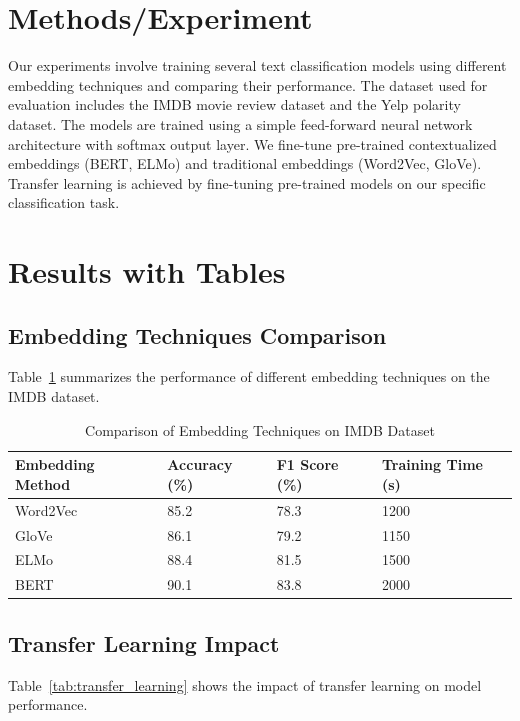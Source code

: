 \documentclass{article}
\begin{document}
\section{Methods/Experiment}
Our experiments involve training several text classification models using different embedding techniques and comparing their performance. The dataset used for evaluation includes the IMDB movie review dataset and the Yelp polarity dataset. The models are trained using a simple feed-forward neural network architecture with softmax output layer. We fine-tune pre-trained contextualized embeddings (BERT, ELMo) and traditional embeddings (Word2Vec, GloVe). Transfer learning is achieved by fine-tuning pre-trained models on our specific classification task.

\section{Results with Tables}
\subsection{Embedding Techniques Comparison}
Table~\ref{tab:embedding_comparison} summarizes the performance of different embedding techniques on the IMDB dataset.

\begin{table}[ht]
\centering
\caption{Comparison of Embedding Techniques on IMDB Dataset}
\label{tab:embedding_comparison}
\begin{tabular}{@{}llll@{}}
\toprule
Embedding Method & Accuracy (\%) & F1 Score (\%) & Training Time (s) \\ \midrule
Word2Vec         & 85.2           & 78.3          & 1200              \\
GloVe            & 86.1           & 79.2          & 1150              \\
ELMo             & 88.4           & 81.5          & 1500              \\
BERT             & 90.1           & 83.8          & 2000              \\ \bottomrule
\end{tabular}
\end{table}

\subsection{Transfer Learning Impact}
Table~\ref{tab:transfer_learning} shows the impact of transfer learning on model performance.
\end{document}
